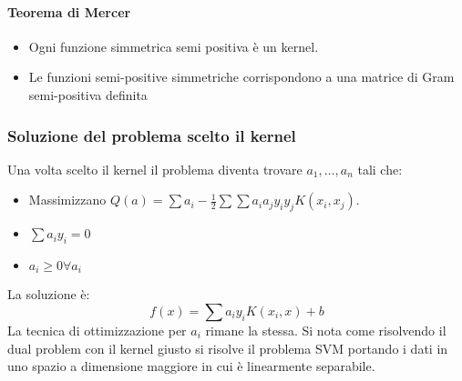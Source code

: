 			\paragraph{Teorema di Mercer}
			\begin{itemize}
				\item Ogni funzione simmetrica semi positiva \`e un kernel.
				\item Le funzioni semi-positive simmetriche corrispondono a una matrice di Gram semi-positiva definita
			\end{itemize}

		\subsubsection{Soluzione del problema scelto il kernel}
		Una volta scelto il kernel il problema diventa trovare $a_1,\dots,a_n$ tali che:
		\begin{itemize}
			\item Massimizzano $Q(a) = \sum a_i-\frac{1}{2}\sum\sum a_ia_jy_iy_jK(x_i,x_j)$.
			\item $\sum a_iy_i = 0$
			\item $a_i\ge 0\forall a_i$
		\end{itemize}
		La soluzione \`e:
		$$f(x) = \sum a_iy_iK(x_i,x)+b$$
		La tecnica di ottimizzazione per $a_i$ rimane la stessa.
		Si nota come risolvendo il dual problem con il kernel giusto si risolve il problema SVM portando i dati in uno spazio a dimensione maggiore in cui \`e linearmente separabile.
